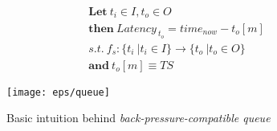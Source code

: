    \begin{equation}
     \begin{gathered}
  \textbf{Let} \ t_{i} \in I , t_{o} \in O \\
\textbf{then} \ Latency_{ \ t_{o}} = time_{now} -  t_{o}[m] \\
s.t. \ f_{s}:\{t_{i} \ | t_{i} \in I \} \to \{t_{o} \ | t_{o} \in O \} \\
\textbf{and} \ t_{o}[m] \equiv TS
  \end{gathered}
  \label{eq_2} 
\end{equation}



\begin{figure}[h]
\centering
\texttt{[image: eps/queue]}
\caption{Basic intuition behind \textit{back-pressure-compatible queue}}
\label{fig_queue}
\end{figure}
